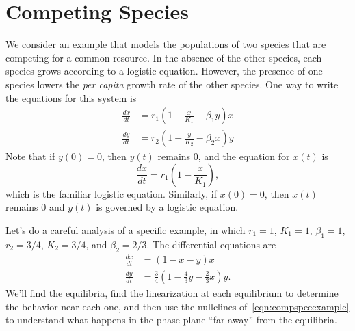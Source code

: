 \documentclass[reqno]{immbook}
\begin{document}
\section{Competing Species}
%
We consider an example that models the populations
of two species that are competing for a common resource.
In the absence of the other species, each species
grows according to a logistic equation.
However, the presence of one species lowers
the \emph{per capita} growth rate of the other species.
One way to write the equations for this system
is
\begin{equation}
\begin{split}
  \frac{dx}{dt} & = r_1\left(1-\frac{x}{K_1}-\beta_1 y\right)x \\
  \frac{dy}{dt} & = r_2\left(1-\frac{y}{K_2}-\beta_2 x\right)y
\end{split}
\end{equation}
Note that if $y(0)=0$, then $y(t)$ remains $0$, and
the equation for $x(t)$ is
\begin{equation}
    \frac{dx}{dt} = r_1 \left(1-\frac{x}{K_1}\right),
\end{equation}
which is the familiar logistic equation.
Similarly, if $x(0)=0$, then $x(t)$ remains $0$ and
$y(t)$ is governed by a logistic equation.

Let's do a careful analysis of a specific example,
in which $r_1 = 1$, $K_1 = 1$, $\beta_1 = 1$, 
$r_2 = 3/4$, $K_2 = 3/4$, and $\beta_2 = 2/3$.
The differential equations are
\begin{equation}
\begin{split}
  \frac{dx}{dt} & = (1-x-y)x \\
  \frac{dy}{dt} & = \frac{3}{4}\left(1 -\frac{4}{3}y - \frac{2}{3}x\right)y .
\end{split}
\label{eqn:compspecexample}
\end{equation}
We'll find the equilibria, find the linearization at each
equilibrium to determine the behavior near each one, and then
use the nullclines of~\eqref{eqn:compspecexample} to understand
what happens in the phase plane ``far away'' from the equilibria.
\end{document}
